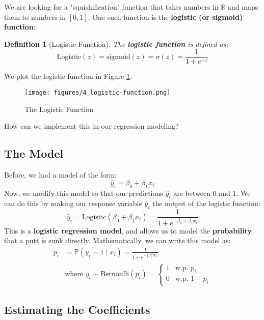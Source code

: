 \documentclass[twoside]{article}
\newtheorem{definition}[theorem]{Definition}
\theoremstyle{definition}
\renewcommand{\P}{\mathbb{P}}
\begin{document}
We are looking for a "squishification" function that takes numbers in $\mathbb{R}$ and maps them to numbers in $[0, 1]$. One such function is the \textbf{logistic  (or sigmoid) function}:
\begin{definition}[Logistic Function]
    The \textbf{logistic function} is defined as:
    \begin{equation}
        \text{Logistic}(z) = \text{sigmoid}(z) = \sigma(z) = \frac{1}{1 + e^{-z}}
    \end{equation}
\end{definition}
We plot the logistic function in Figure \ref{fig:logistic-function}.
\begin{figure}[H]
    \centering
    \texttt{[image: figures/4\_logistic-function.png]}
    \caption{The Logistic Function}
    \label{fig:logistic-function}
\end{figure}
How can we implement this in our regression modeling?

\subsection{The Model}

Before, we had a model of the form:
\begin{equation}
    \widehat{y}_i = \beta_0 + \beta_1 x_i
\end{equation}
Now, we modify this model so that our predictions $\widehat{y}_i$ are between 0 and 1. We can do this by making our response variable $\widehat{y}_i$ the output of the logistic function:
\begin{equation}
    \widehat{y}_i = \text{Logistic}(\beta_0 + \beta_1 x_i) = \frac{1}{1 + e^{-\beta_0 + \beta_1 x_i}}
\end{equation}
This is a \textbf{logistic regression model}, and allows us to model the \textbf{probability} that a putt is sunk directly. Mathematically, we can write this model as:
\begin{align}
    p_i &= \P(y_i = 1 \mid x_i) = \frac{1}{1 + e^{-(x_i^T\boldsymbol{\beta})}} \\
    &\text{where } y_i \sim \text{Bernoulli}(p_i )= \begin{cases}
        1 & \text{w.p. } p_i \\
        0 & \text{w.p. } 1-p_i
    \end{cases}
\end{align}

\subsection{Estimating the Coefficients}
\end{document}
